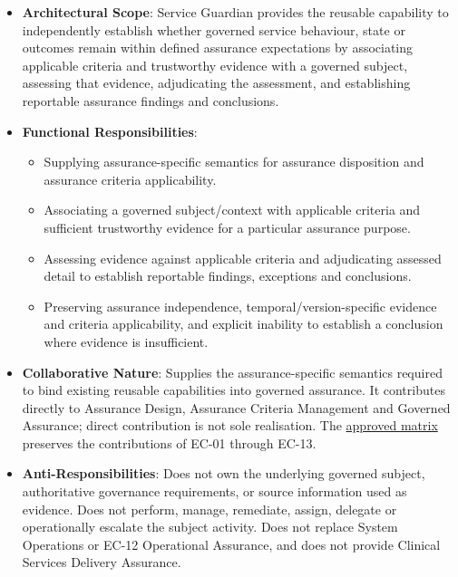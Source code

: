 \begin{itemize}

\item 
\textbf{Architectural Scope}: Service Guardian provides the reusable capability to independently establish whether governed service behaviour, state or outcomes remain within defined assurance expectations by associating applicable criteria and trustworthy evidence with a governed subject, assessing that evidence, adjudicating the assessment, and establishing reportable assurance findings and conclusions.



\item 
\textbf{Functional Responsibilities}:


\begin{itemize}

\item 
Supplying assurance-specific semantics for assurance disposition and assurance criteria applicability.



\item 
Associating a governed subject/\allowbreak{}context with applicable criteria and sufficient trustworthy evidence for a particular assurance purpose.



\item 
Assessing evidence against applicable criteria and adjudicating assessed detail to establish reportable findings, exceptions and conclusions.



\item 
Preserving assurance independence, temporal/\allowbreak{}version-specific evidence and criteria applicability, and explicit inability to establish a conclusion where evidence is insufficient.



\end{itemize}


\item 
\textbf{Collaborative Nature}: Supplies the assurance-specific semantics required to bind existing reusable capabilities into governed assurance. It contributes directly to Assurance Design, Assurance Criteria Management and Governed Assurance; direct contribution is not sole realisation. The \hyperref[rad:assurance-strategy:54]{approved matrix} preserves the contributions of EC-01 through EC-13.



\item 
\textbf{Anti-Responsibilities}: Does not own the underlying governed subject, authoritative governance requirements, or source information used as evidence. Does not perform, manage, remediate, assign, delegate or operationally escalate the subject activity. Does not replace System Operations or EC-12 Operational Assurance, and does not provide Clinical Services Delivery Assurance.




\end{itemize}
